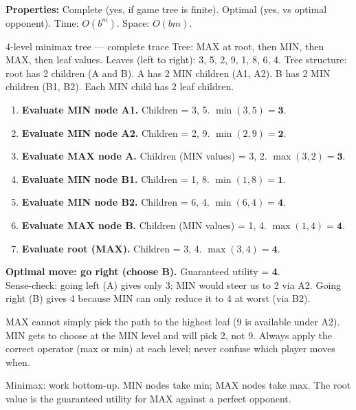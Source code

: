 \documentclass[a4paper,11pt]{article}
\begin{document}
\textbf{Properties:} Complete (yes, if game tree is finite). Optimal (yes, vs optimal opponent). Time: $O(b^m)$. Space: $O(bm)$.

\begin{worked}{4-level minimax tree — complete trace}
Tree: MAX at root, then MIN, then MAX, then leaf values.
Leaves (left to right): 3, 5, 2, 9, 1, 8, 6, 4.
Tree structure: root has 2 children (A and B). A has 2 MIN children (A1, A2). B has 2 MIN children (B1, B2). Each MIN child has 2 leaf children.

\begin{enumerate}[label=\textbf{Step \arabic*.}]
  \item \textbf{Evaluate MIN node A1.} Children = 3, 5. $\min(3,5) = \mathbf{3}$.
  \item \textbf{Evaluate MIN node A2.} Children = 2, 9. $\min(2,9) = \mathbf{2}$.
  \item \textbf{Evaluate MAX node A.} Children (MIN values) = 3, 2. $\max(3,2) = \mathbf{3}$.
  \item \textbf{Evaluate MIN node B1.} Children = 1, 8. $\min(1,8) = \mathbf{1}$.
  \item \textbf{Evaluate MIN node B2.} Children = 6, 4. $\min(6,4) = \mathbf{4}$.
  \item \textbf{Evaluate MAX node B.} Children (MIN values) = 1, 4. $\max(1,4) = \mathbf{4}$.
  \item \textbf{Evaluate root (MAX).} Children = 3, 4. $\max(3,4) = \mathbf{4}$.
\end{enumerate}
\textbf{Optimal move: go right (choose B).} Guaranteed utility = \textbf{4}. \\
Sense-check: going left (A) gives only 3; MIN would steer us to 2 via A2. Going right (B) gives 4 because MIN can only reduce it to 4 at worst (via B2).
\end{worked}

\begin{watchout}
MAX cannot simply pick the path to the highest leaf (9 is available under A2). MIN gets to choose at the MIN level and will pick 2, not 9. Always apply the correct operator (max or min) at each level; never confuse which player moves when.
\end{watchout}

\begin{keytake}
Minimax: work bottom-up. MIN nodes take min; MAX nodes take max. The root value is the guaranteed utility for MAX against a perfect opponent.
\end{keytake}
\end{document}
